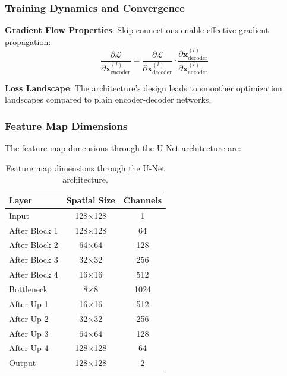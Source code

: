 \documentclass[12pt,a4paper]{article}
\begin{document}
\subsubsection{Training Dynamics and Convergence}

\textbf{Gradient Flow Properties}:
Skip connections enable effective gradient propagation:
\begin{equation}
\frac{\partial \mathcal{L}}{\partial \mathbf{x}^{(l)}_{\text{encoder}}} = \frac{\partial \mathcal{L}}{\partial \mathbf{x}^{(l)}_{\text{decoder}}} \cdot \frac{\partial \mathbf{x}^{(l)}_{\text{decoder}}}{\partial \mathbf{x}^{(l)}_{\text{encoder}}}
\end{equation}

\textbf{Loss Landscape}:
The architecture's design leads to smoother optimization landscapes compared to plain encoder-decoder networks.

\subsubsection{Feature Map Dimensions}

The feature map dimensions through the U-Net architecture are:

\begin{table}[H]
    \centering
    \begin{tabular}{lcc}
        \toprule
        \textbf{Layer} & \textbf{Spatial Size} & \textbf{Channels} \\
        \midrule
        Input & 128×128 & 1 \\
        After Block 1 & 128×128 & 64 \\
        After Block 2 & 64×64 & 128 \\
        After Block 3 & 32×32 & 256 \\
        After Block 4 & 16×16 & 512 \\
        Bottleneck & 8×8 & 1024 \\
        After Up 1 & 16×16 & 512 \\
        After Up 2 & 32×32 & 256 \\
        After Up 3 & 64×64 & 128 \\
        After Up 4 & 128×128 & 64 \\
        Output & 128×128 & 2 \\
        \bottomrule
    \end{tabular}
    \caption{Feature map dimensions through the U-Net architecture.}
    \label{tab:feature_dims}
\end{table}
\end{document}
